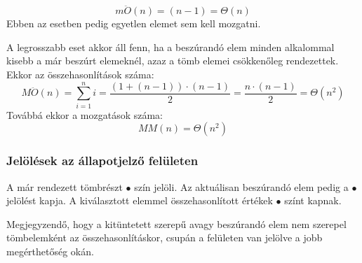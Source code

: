 \documentclass{elteikthesis}
\newcommand{\hiddensubsubsection}[1]{
	\stepcounter{subsubsection}
	\subsubsection*{{#1}}	
}
\begin{document}
$$m\ddot{O}(n)=(n-1)=\Theta(n)$$
Ebben az esetben pedig egyetlen elemet sem kell mozgatni.\par
A legrosszabb eset akkor áll fenn, ha a beszúrandó elem minden alkalommal kisebb a már beszúrt elemeknél, azaz a tömb elemei csökkenőleg rendezettek\cite{Fekete}. Ekkor az összehasonlítások száma:
$$M\ddot{O}(n)=\sum\limits_{i=1}^n i = \frac{(1+(n-1))\cdot(n-1)}{2}=\frac{n\cdot(n-1)}{2}=\Theta(n^2)$$
Továbbá ekkor a mozgatások száma:
$$MM(n)=\Theta(n^2)$$
\hiddensubsubsection{Jelölések az állapotjelző felületen}
A már rendezett tömbrészt \textcolor{done}{\Huge$\bullet$} szín jelöli. Az aktuálisan beszúrandó elem pedig a \textcolor{select}{\Huge$\bullet$} jelölést kapja. A kiválasztott elemmel összehasonlított értékek \textcolor{swap}{\Huge$\bullet$} színt kapnak.\par
Megjegyzendő, hogy a kitüntetett szerepű avagy beszúrandó elem nem szerepel tömbelemként az összehasonlításkor, csupán a felületen van jelölve a jobb megérthetőség okán.
\end{document}
